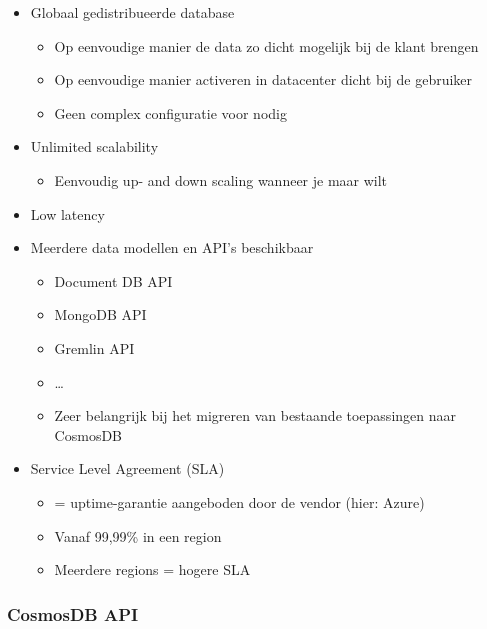 \documentclass{article}
\begin{document}
\begin{itemize}
    \item Globaal gedistribueerde database
    \begin{itemize}
        \item Op eenvoudige manier de data zo dicht mogelijk bij de klant brengen
        \item Op eenvoudige manier activeren in datacenter dicht bij de gebruiker
        \item Geen complex configuratie voor nodig
    \end{itemize}
    \item Unlimited scalability
    \begin{itemize}
        \item Eenvoudig up- and down scaling wanneer je maar wilt
    \end{itemize}
    \item Low latency
    \item Meerdere data modellen en API's beschikbaar
    \begin{itemize}
        \item Document DB API
        \item MongoDB API
        \item Gremlin API
        \item \dots
        \item Zeer belangrijk bij het migreren van bestaande toepassingen naar CosmosDB
    \end{itemize}
    \item Service Level Agreement (SLA)
    \begin{itemize}
        \item = uptime-garantie aangeboden door de vendor (hier: Azure)
        \item Vanaf 99,99\% in een region
        \item Meerdere regions = hogere SLA
    \end{itemize} 
\end{itemize}

\subsubsection{CosmosDB API}
\end{document}
